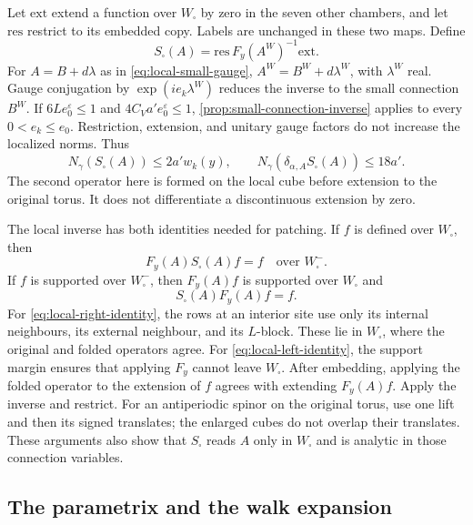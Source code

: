 Let $\mathrm{ext}$ extend a function over $W_\square$ by zero in the
seven other chambers, and let $\mathrm{res}$ restrict to its embedded
copy. Labels are unchanged in these two maps. Define
\[
 S_\square(A)=\mathrm{res}\,F_y(A^W)^{-1}\mathrm{ext}.
\]
For $A=B+d\lambda$ as in \eqref{eq:local-small-gauge},
$A^W=B^W+d\lambda^W$, with $\lambda^W$ real. Gauge conjugation by
$\exp(ie_k\lambda^W)$ reduces the inverse to the small connection
$B^W$. If $6Le_0^\varepsilon\le1$ and
$4C_Va'e_0^\varepsilon\le1$, \cref{prop:small-connection-inverse}
applies to every $0<e_k\le e_0$. Restriction, extension, and unitary
gauge factors do not increase the localized norms. Thus
\begin{equation}\label{eq:local-inverse-bounds}
 N_\gamma(S_\square(A))\le2a'w_k(y),\qquad
 N_\gamma(\delta_{\alpha,A}S_\square(A))\le18a'.
\end{equation}
The second operator here is formed on the local cube before extension
to the original torus. It does not differentiate a discontinuous
extension by zero.

The local inverse has both identities needed for patching. If $f$ is
defined over $W_\square$, then
\begin{equation}\label{eq:local-right-identity}
 F_y(A)S_\square(A)f=f\quad\text{over }W_\square^-.
\end{equation}
If $f$ is supported over $W_\square^-$, then $F_y(A)f$ is supported
over $W_\square$ and
\begin{equation}\label{eq:local-left-identity}
 S_\square(A)F_y(A)f=f.
\end{equation}
For \eqref{eq:local-right-identity}, the rows at an interior site use
only its internal neighbours, its external neighbour, and its
$L$-block. These lie in $W_\square$, where the original and folded
operators agree. For \eqref{eq:local-left-identity}, the support
margin ensures that applying $F_y$ cannot leave $W_\square$.
After embedding, applying the folded operator to the extension of
$f$ agrees with extending $F_y(A)f$. Apply the inverse and restrict.
For an antiperiodic spinor on the original torus, use one lift and
then its signed translates; the enlarged cubes do not overlap their
translates. These arguments also show that $S_\square$ reads $A$
only in $W_\square$ and is analytic in those connection variables.

\subsection{The parametrix and the walk expansion}\label{subsec:propagator-walks}

